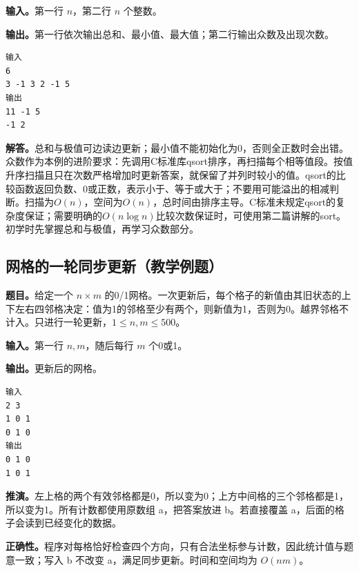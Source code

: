 \noindent\textbf{输入。}第一行 $n$，第二行 $n$ 个整数。

\noindent\textbf{输出。}第一行依次输出总和、最小值、最大值；第二行输出众数及出现次数。
\begin{verbatim}
输入
6
3 -1 3 2 -1 5
输出
11 -1 5
-1 2
\end{verbatim}

\noindent\textbf{解答。}总和与极值可边读边更新；最小值不能初始化为0，否则全正数时会出错。众数作为本例的进阶要求：先调用C标准库qsort排序，再扫描每个相等值段。按值升序扫描且只在次数严格增加时更新答案，就保留了并列时较小的值。qsort的比较函数返回负数、0或正数，表示小于、等于或大于；不要用可能溢出的相减判断。扫描为$O(n)$，空间为$O(n)$，总时间由排序主导。C标准未规定qsort的复杂度保证；需要明确的$O(n\log n)$比较次数保证时，可使用第二篇讲解的sort。初学时先掌握总和与极值，再学习众数部分。
\subsection{网格的一轮同步更新（教学例题）}

\noindent\textbf{题目。}给定一个 $n\times m$ 的0/1网格。一次更新后，每个格子的新值由其旧状态的上下左右四邻格决定：值为1的邻格至少有两个，则新值为1，否则为0。越界邻格不计入。只进行一轮更新，$1\le n,m\le500$。

\noindent\textbf{输入。}第一行 $n,m$，随后每行 $m$ 个0或1。

\noindent\textbf{输出。}更新后的网格。
\begin{verbatim}
输入
2 3
1 0 1
0 1 0
输出
0 1 0
1 0 1
\end{verbatim}

\noindent\textbf{推演。}左上格的两个有效邻格都是0，所以变为0；上方中间格的三个邻格都是1，所以变为1。所有计数都使用原数组 a，把答案放进 b。若直接覆盖 a，后面的格子会读到已经变化的数据。

\noindent\textbf{正确性。}程序对每格恰好检查四个方向，只有合法坐标参与计数，因此统计值与题意一致；写入 b 不改变 a，满足同步更新。时间和空间均为 $O(nm)$。
